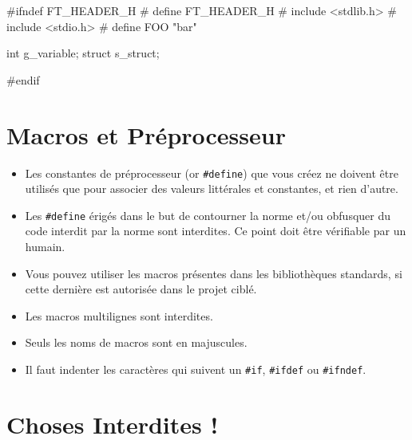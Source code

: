 \documentclass{42-fr}
\begin{document}
        \begin{42ccode}
#ifndef FT_HEADER_H
# define FT_HEADER_H
# include <stdlib.h>
# include <stdio.h>
# define FOO "bar"

int g_variable;
struct s_struct;

#endif
        \end{42ccode}
        \newpage

    \section{Macros et Préprocesseur}

        \begin{itemize}

            \item Les constantes de préprocesseur (or \texttt{\#define}) que vous créez ne doivent
                être utilisés que pour associer des valeurs littérales et constantes, et rien d’autre.
            \item Les \texttt{\#define} érigés dans le but de contourner la norme et/ou obfusquer
                du code interdit par la norme sont interdites. 
                Ce point doit être vérifiable par un humain.
            \item Vous pouvez utiliser les macros présentes dans les bibliothèques standards,
                si cette dernière est autorisée dans le projet ciblé.
            \item Les macros multilignes sont interdites.
            \item Seuls les noms de macros sont en majuscules.
            \item Il faut indenter les caractères qui suivent un \texttt{\#if}, \texttt{\#ifdef}
                ou \texttt{\#ifndef}.

        \end{itemize}
        \newpage


    \section{Choses Interdites !}
\end{document}
